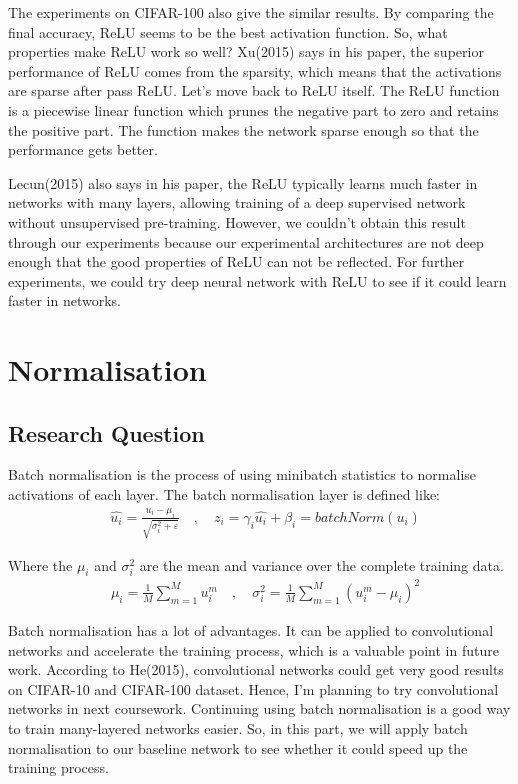 \documentclass[]{article}
\begin{document}
The experiments on CIFAR-100 also give the similar results. By comparing the final accuracy, ReLU seems to be the best activation function. So, what properties make ReLU work so well? Xu(2015) says in his paper, the superior performance of ReLU comes from the sparsity, which means that the activations are sparse after pass ReLU. Let's move back to ReLU itself. The ReLU function is a piecewise linear function which prunes the negative part to zero and retains the positive part. The function makes the network sparse enough so that the performance gets better. 

Lecun(2015) also says in his paper, the ReLU typically learns much faster 
in networks with many layers, allowing training of a deep supervised 
network without unsupervised pre-training. However, we couldn't obtain this result through our experiments because our experimental architectures are not deep enough that the good properties of ReLU can not be reflected. For further experiments, we could try deep neural network with ReLU to see if it could learn faster in networks.

\section{Normalisation}
\subsection{Research Question}
Batch normalisation is the process of using minibatch statistics to normalise activations of each layer. The batch normalisation layer is defined like:
\begin{align*}
& \widehat{u_i} = \frac{u_i - \mu_i}{\sqrt{\sigma_i^2 + \varepsilon}} 
  \quad , \quad z_i = \gamma_i \widehat{u_i} + \beta_i = batchNorm(u_i)
\end{align*}

Where the $\mu_i$ and $\sigma_i^2$ are the mean and variance over the complete training data.
\begin{align*}
& \mu_i = \frac{1}{M} \sum_{m=1}^{M} u_i^m \quad , \quad
  \sigma_i^2 = \frac{1}{M} \sum_{m=1}^{M}(u_i^m-\mu_i)^2 
\end{align*}

Batch normalisation has a lot of advantages. It can be applied to convolutional networks and accelerate the training process, which is a valuable point in future work. According to He(2015), convolutional networks could get very good results on CIFAR-10 and CIFAR-100 dataset. Hence, I'm planning to try convolutional networks in next coursework. Continuing using batch normalisation is a good way to train many-layered networks easier. So, in this part, we will apply batch normalisation to our baseline network to see whether it could speed up the training process.
\end{document}
